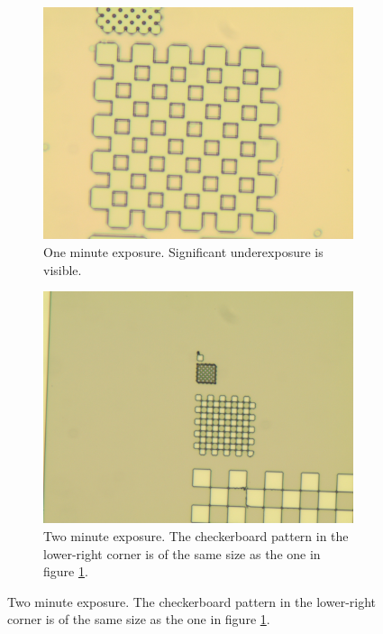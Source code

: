 \begin{figure}[!b]
    \centering
    \begin{subfigure}[t]{0.3\linewidth}
        \centering
        \includegraphics[width=\textwidth]{data/b3d1.jpg}
        \caption{One minute exposure. Significant underexposure is visible.}
        \label{fig:b3d1}
    \end{subfigure}
    \hfill
    \begin{subfigure}[t]{0.3\linewidth}
        \centering
        \includegraphics[width=\textwidth]{data/b3a1.jpg}
        \caption{Two minute exposure. The checkerboard pattern in the lower-right corner is of the same size as the one in figure \ref{fig:b3d1}.}
        \label{fig:b3a1}

\end{subfigure}
\end{figure}
